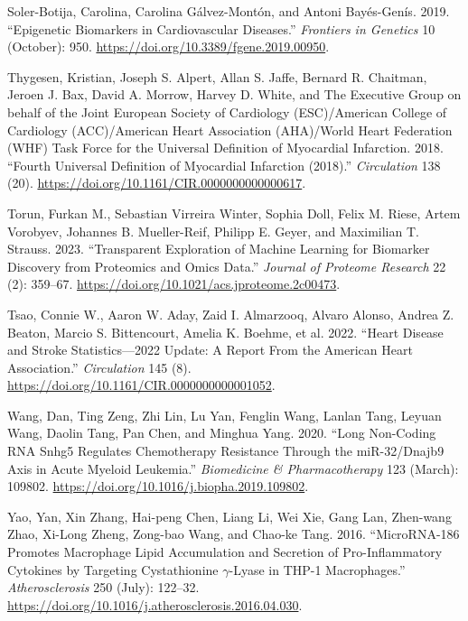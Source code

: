 \documentclass[smallextended]{svjour3}       %
\newlength{\cslhangindent}
\newlength{\cslentryspacingunit} %
\newenvironment{CSLReferences}[2] %
 {%
  \setlength{\parindent}{0pt}
  \ifodd #1
  \let\oldpar\par
  \def\par{\hangindent=\cslhangindent\oldpar}
  \fi
  \setlength{\parskip}{#2\cslentryspacingunit}
 }%
 {}
\begin{document}
\begin{CSLReferences}{1}{0}
\leavevmode{}%
Soler-Botija, Carolina, Carolina Gálvez-Montón, and Antoni Bayés-Genís.
2019. {``Epigenetic {Biomarkers} in {Cardiovascular} {Diseases}.''}
\emph{Frontiers in Genetics} 10 (October): 950.
\url{https://doi.org/10.3389/fgene.2019.00950}.

\leavevmode{}%
Thygesen, Kristian, Joseph S. Alpert, Allan S. Jaffe, Bernard R.
Chaitman, Jeroen J. Bax, David A. Morrow, Harvey D. White, and The
Executive Group on behalf of the Joint European Society of Cardiology
(ESC)/American College of Cardiology (ACC)/American Heart Association
(AHA)/World Heart Federation (WHF) Task Force for the Universal
Definition of Myocardial Infarction. 2018. {``Fourth {Universal}
{Definition} of {Myocardial} {Infarction} (2018).''} \emph{Circulation}
138 (20). \url{https://doi.org/10.1161/CIR.0000000000000617}.

\leavevmode{}%
Torun, Furkan M., Sebastian Virreira Winter, Sophia Doll, Felix M.
Riese, Artem Vorobyev, Johannes B. Mueller-Reif, Philipp E. Geyer, and
Maximilian T. Strauss. 2023. {``Transparent {Exploration} of {Machine}
{Learning} for {Biomarker} {Discovery} from {Proteomics} and {Omics}
{Data}.''} \emph{Journal of Proteome Research} 22 (2): 359--67.
\url{https://doi.org/10.1021/acs.jproteome.2c00473}.

\leavevmode{}%
Tsao, Connie W., Aaron W. Aday, Zaid I. Almarzooq, Alvaro Alonso, Andrea
Z. Beaton, Marcio S. Bittencourt, Amelia K. Boehme, et al. 2022.
{``Heart {Disease} and {Stroke} {Statistics}---2022 {Update}: {A}
{Report} {From} the {American} {Heart} {Association}.''}
\emph{Circulation} 145 (8).
\url{https://doi.org/10.1161/CIR.0000000000001052}.

\leavevmode{}%
Wang, Dan, Ting Zeng, Zhi Lin, Lu Yan, Fenglin Wang, Lanlan Tang, Leyuan
Wang, Daolin Tang, Pan Chen, and Minghua Yang. 2020. {``Long Non-Coding
{RNA} {Snhg5} Regulates Chemotherapy Resistance Through the
{miR}-32/{Dnajb9} Axis in Acute Myeloid Leukemia.''} \emph{Biomedicine
\& Pharmacotherapy} 123 (March): 109802.
\url{https://doi.org/10.1016/j.biopha.2019.109802}.

\leavevmode{}%
Yao, Yan, Xin Zhang, Hai-peng Chen, Liang Li, Wei Xie, Gang Lan,
Zhen-wang Zhao, Xi-Long Zheng, Zong-bao Wang, and Chao-ke Tang. 2016.
{``{MicroRNA}-186 Promotes Macrophage Lipid Accumulation and Secretion
of Pro-Inflammatory Cytokines by Targeting Cystathionine
\(\gamma\)-Lyase in {THP}-1 Macrophages.''} \emph{Atherosclerosis} 250
(July): 122--32.
\url{https://doi.org/10.1016/j.atherosclerosis.2016.04.030}.


\end{CSLReferences}
\end{document}
